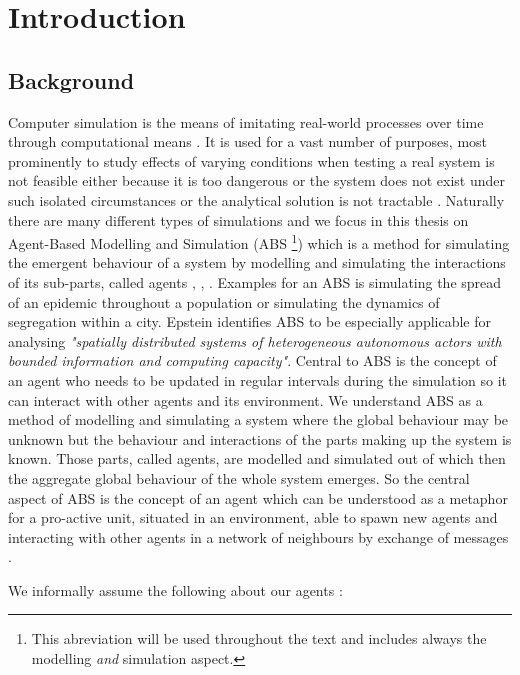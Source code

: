 \chapter{Introduction}
\label{chap:intro}

\section{Background}
Computer simulation is the means of imitating real-world processes over time through computational means \cite{banks_discrete-event_2013}. It is used for a vast number of purposes, most prominently to study effects of varying conditions when testing a real system is not feasible either because it is too dangerous or the system does not exist under such isolated circumstances or the analytical solution is not tractable \cite{sokolowski_principles_2009}. Naturally there are many different types of simulations and we focus in this thesis on Agent-Based Modelling and Simulation (ABS \footnote{This abreviation will be used throughout the text and includes always the modelling \textit{and} simulation aspect.}) which is a method for simulating the emergent behaviour of a system by modelling and simulating the interactions of its sub-parts, called agents \cite{siebers_introduction_2008}, \cite{axelrod_guide_2006}, \cite{wilensky_introduction_2015}. Examples for an ABS is simulating the spread of an epidemic throughout a population or simulating the dynamics of segregation within a city. Epstein \cite{epstein_generative_2012} identifies ABS to be especially applicable for analysing \textit{"spatially distributed systems of heterogeneous autonomous actors with bounded information and computing capacity"}. Central to ABS is the concept of an agent who needs to be updated in regular intervals during the simulation so it can interact with other agents and its environment.
We understand ABS as a method of modelling and simulating a system where the global behaviour may be unknown but the behaviour and interactions of the parts making up the system is known. Those parts, called agents, are modelled and simulated out of which then the aggregate global behaviour of the whole system emerges. So the central aspect of ABS is the concept of an agent which can be understood as a metaphor for a pro-active unit, situated in an environment, able to spawn new agents and interacting with other agents in a network of neighbours by exchange of messages \cite{wooldridge_introduction_2009}.

We informally assume the following about our agents \cite{wooldridge_intelligent_1995}:

